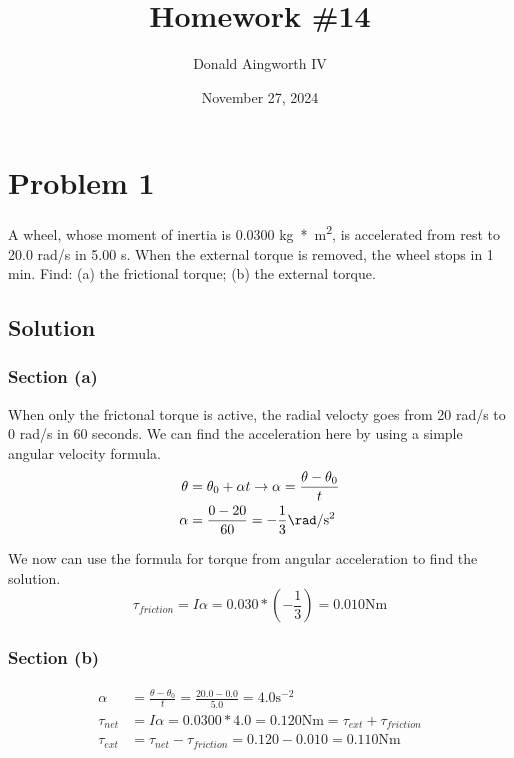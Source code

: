 \documentclass[12pt]{article}
\title{Homework \#14}
\author{Donald Aingworth IV}
\date{November 27, 2024}
\begin{document}

\maketitle

\pagebreak

\section{Problem 1}
A wheel, whose moment of inertia is 0.0300 \unit{\kilo\gram*\meter^2}, is accelerated from rest to 20.0 rad/s in 5.00 s. When the external torque is removed, the wheel stops in 1 min. Find: (a) the frictional torque; (b) the external torque.

\subsection{Solution}
\subsubsection{Section (a)}
When only the frictonal torque is active, the radial velocty goes from 20 rad/s to 0 rad/s in 60 seconds. We can find the acceleration here by using a simple angular velocity formula.
\begin{align}
    \theta  &=  \theta_0 + \alpha t \rightarrow \alpha = \frac{\theta - \theta_0}{t}\\
    \alpha  &=  \frac{0 - 20}{60} = -\frac{1}{3}\unit{\rad/\second^2}
\end{align}

We now can use the formula for torque from angular acceleration to find the solution.
\begin{equation}
    \tau_{friction} =   I \alpha 
        = 0.030 * \left(-\frac{1}{3}\right) 
        = \boxed{0.010\unit{\newton\meter}}
\end{equation}

\subsubsection{Section (b)}
\begin{align}
    \alpha  &=  \frac{\theta - \theta_0}{t}
        =   \frac{20.0 - 0.0}{5.0}
        =   4.0 \unit{\second^{-2}}\\
    \tau_{net}  &=  I\alpha
        =   0.0300 * 4.0
        =   0.120 \unit{\newton\meter}
        =   \tau_{ext} + \tau_{friction}\\
    \tau_{ext}  &=  \tau_{net} - \tau_{friction}
        =   0.120 - 0.010
        =   \boxed{0.110 \unit{\newton\meter}}
\end{align}
\end{document}
